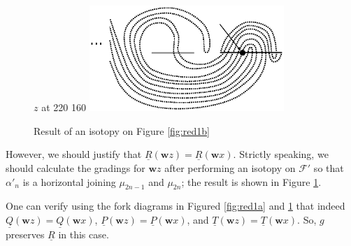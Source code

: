 \documentclass[11pt]{article}
\theoremstyle{plain} \newtheorem{thm}{Theorem}[subsection]
\theoremstyle{plain} \newtheorem{cor}[thm]{Corollary}
\theoremstyle{plain} \newtheorem{prop}[thm]{Proposition}
\theoremstyle{plain} \newtheorem{conj}[thm]{Conjecture}
\theoremstyle{plain} \newtheorem{lem}[thm]{Lemma}
\theoremstyle{definition} \newtheorem{df}[thm]{Definition}
\theoremstyle{remark} \newtheorem{rmk}[thm]{Remark}
\theoremstyle{remark} \newtheorem{obs}[thm]{Observation}
\newcommand{\red}[1]{\underline{#1}}
\newcommand{\ba}{\boldsymbol{\alpha}}
\newcommand{\bb}{\boldsymbol{\beta}}
\newcommand{\bw}{\mathbf{w}}
\numberwithin{equation}{section}
\begin{document}

\begin{figure}[h]
\centering
\begin{minipage}[c]{.55\linewidth}
\small
\pinlabel* $z$ at 220 160
\endlabellist
\includegraphics[height = 40mm]{Red1b_mod_iso}
\end{minipage}
\begin{minipage}[c]{.40\linewidth}
\caption{Result of an isotopy on Figure \ref{fig:red1b}}
\label{fig:red1biso}
\end{minipage}
\end{figure}


However, we should justify that $\red{R}(\bw z) = \red{R}(\bw x)$.  Strictly speaking, we should calculate the gradings for $\bw z$ after performing an isotopy on $\mathcal{F}'$ so that $\alpha'_{n}$ is a horizontal joining $\mu_{2n-1}$ and $\mu_{2n}$; the result is shown in Figure \ref{fig:red1biso}.

One can verify using the fork diagrams in Figured \ref{fig:red1a} and \ref{fig:red1biso} that indeed $\red{Q}(\bw z) = \red{Q}(\bw x)$, $\red{ P}(\bw z) = \red{ P}(\bw x)$, and $\red{T}(\bw z) = \red{T}(\bw x)$.  So, $g$ preserves $\red{R}$ in this case.
\end{document}
